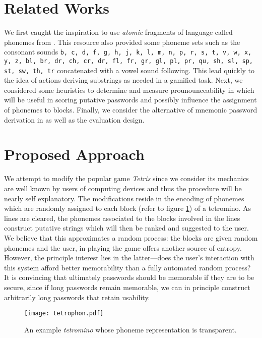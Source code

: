 \documentclass[conference]{IEEEtran}
\begin{document}
\section{Related Works}
We first caught the inspiration to use \emph{atomic} fragments of language called phonemes from \cite{proposal:phonemes}. This resource also provided some phoneme sets such as the consonant sounds {\tt b, c, d, f, g, h, j, k, l, m, n, p, r, s, t, v, w, x, y, z, bl, br, dr, ch, cr, dr, fl, fr, gr, gl, pl, pr, qu, sh, sl, sp, st, sw, th, tr} concatenated with a vowel sound following. This lead quickly to the idea of actions deriving substrings as needed in a gamified task. Next, we considered some heuristics to determine and measure prounounceability in \cite{proposal:prounounceability} which will be useful in scoring putative passwords and possibly influence the assignment of phonemes to blocks. Finally, we consider the alternative of mnemonic password derivation in \cite{proposal:mnemonic} as well as the evaluation design.

\section{Proposed Approach}
We attempt to modify the popular game \emph{Tetris} since we consider its mechanics are well known by users of computing devices and thus the procedure will be nearly self explanatory. The modifications reside in the encoding of phonemes which are randomly assigned to each block (refer to figure \ref{tet}) of a tetromino. As lines are cleared, the phonemes associated to the blocks involved in the lines construct putative strings which will then be ranked and suggested to the user. We believe that this approximates a random process: the blocks are given random phonemes and the user, in playing the game offers another source of entropy. However, the principle interest lies in the latter---does the user's interaction with this system afford better memorability than a fully automated random process? It is convincing that ultimately passwords should be memorable if they are to be secure, since if long passwords remain memorable, we can in principle construct arbitrarily long passwords that retain usability.
\begin{figure}[t]
	\texttt{[image: tetrophon.pdf]}
	\caption{An example \emph{tetromino} whose phoneme representation is transparent.}
	\label{tet}
\end{figure}
\end{document}
